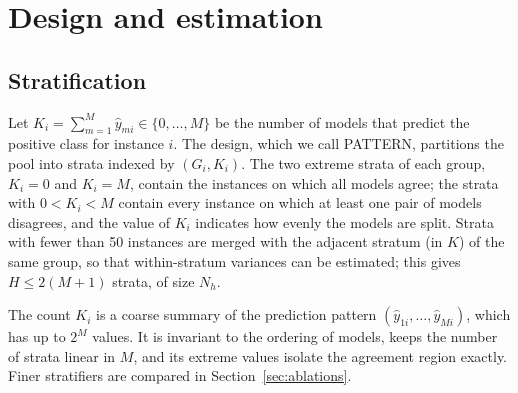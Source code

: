 \section{Design and estimation}\label{sec:design}

\subsection{Stratification}
Let $K_i=\sum_{m=1}^M\hat y_{mi}\in\{0,\dots,M\}$ be the number of models that predict the positive class for instance $i$. The design, which we call PATTERN, partitions the pool into strata indexed by $(G_i,K_i)$. The two extreme strata of each group, $K_i=0$ and $K_i=M$, contain the instances on which all models agree; the strata with $0<K_i<M$ contain every instance on which at least one pair of models disagrees, and the value of $K_i$ indicates how evenly the models are split. Strata with fewer than 50 instances are merged with the adjacent stratum (in $K$) of the same group, so that within-stratum variances can be estimated; this gives $H\le 2(M+1)$ strata, of size $N_h$.

The count $K_i$ is a coarse summary of the prediction pattern $(\hat y_{1i},\dots,\hat y_{Mi})$, which has up to $2^M$ values. It is invariant to the ordering of models, keeps the number of strata linear in $M$, and its extreme values isolate the agreement region exactly. Finer stratifiers are compared in Section~\ref{sec:ablations}.


